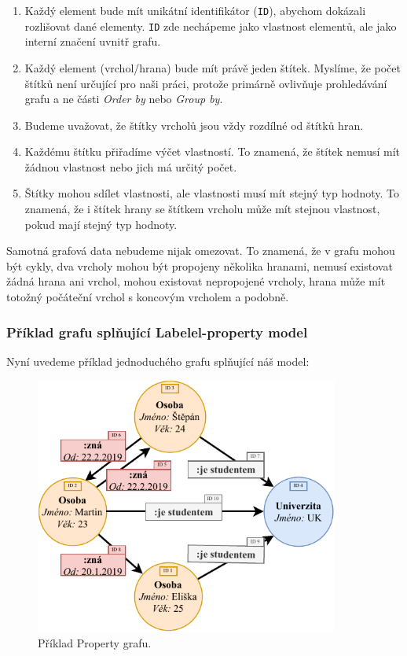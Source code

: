 \begin{enumerate}

\item
Každý element bude mít unikátní identifikátor (\texttt{ID}), abychom dokázali rozlišovat dané elementy.
\texttt{ID} zde nechápeme jako vlastnost elementů, ale jako interní značení uvnitř grafu.

\item
Každý element (vrchol/hrana) bude mít právě jeden štítek.
Myslíme, že počet štítků není určující pro naši práci, protože primárně ovlivňuje prohledávání grafu a ne části \textit{Order by} nebo \textit{Group by}.

\item
Budeme uvažovat, že štítky vrcholů jsou vždy rozdílné od štítků hran.

\item
Každému štítku přiřadíme výčet vlastností.
To znamená, že štítek nemusí mít žádnou vlastnost nebo jich má určitý počet.

\item
Štítky mohou sdílet vlastnosti, ale vlastnosti musí mít stejný typ hodnoty.
To znamená, že i štítek hrany se štítkem vrcholu může mít stejnou vlastnost, pokud mají stejný typ hodnoty.

\end{enumerate}

Samotná grafová data nebudeme nijak omezovat.
To znamená, že v grafu mohou být cykly, dva vrcholy mohou být propojeny několika hranami, nemusí existovat žádná hrana ani vrchol, mohou existovat nepropojené vrcholy, hrana může mít totožný počáteční vrchol s koncovým vrcholem a podobně.

\subsubsection{Příklad grafu splňující Labelel-property model}
Nyní uvedeme příklad jednoduchého grafu splňující náš model:

\begin{figure}[!htp]
\includegraphics[width=100mm]{../img/propertyexample.pdf}\centering
\caption{Příklad Property grafu.}
\label{figure.propertygraphexample}
\end{figure}

